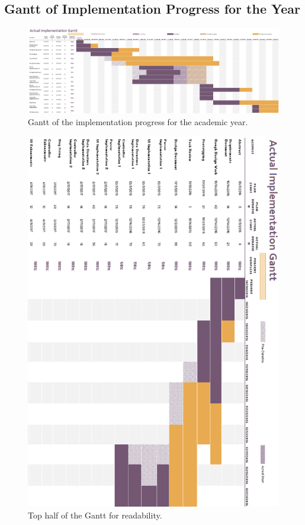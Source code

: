 \documentclass[letterpaper,10pt,titlepage,draftclsnofoot,onecolumn,onesided] {IEEEtran}
\begin{document}
\subsection{Gantt of Implementation Progress for the Year}
\begin{figure}[H]
	\centering
	\includegraphics[width=.75\textwidth]{Gantt}
	\caption{Gantt of the implementation progress for the academic year.}
\end{figure}
\begin{figure}[H]
	\centering
	\includegraphics[width=.75\textwidth]{GanttTop}
	\caption{Top half of the Gantt for readability.}
\end{figure}
\end{document}
